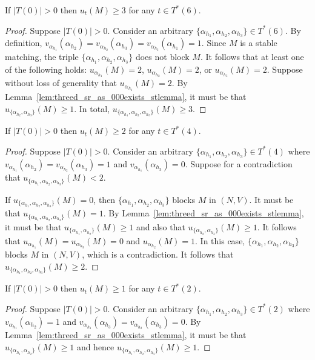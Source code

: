 \begin{lem}
\label{lem:threed_sr_as_some000exists_r1_lem}
If $|T(0)| > 0$ then $u_t(M)\geq 3$ for any $t \in T^*(6)$.
\end{lem}
\begin{proof}
Suppose $|T(0)| > 0$. Consider an arbitrary $\{ \alpha_{h_1}, \alpha_{h_2}, \alpha_{h_3} \} \in T^*(6)$. By definition, $v_{\alpha_{h_1}}(\alpha_{h_2})=v_{\alpha_{h_2}}(\alpha_{h_3})=v_{\alpha_{h_3}}(\alpha_{h_1})=1$. Since $M$ is a stable matching, the triple $\{ \alpha_{h_1}, \alpha_{h_2}, \alpha_{h_3} \}$ does not block $M$. It follows that at least one of the following holds: $u_{\alpha_{h_1}}(M)=2$, $u_{\alpha_{h_2}}(M)=2$, or $u_{\alpha_{h_3}}(M)=2$. Suppose without loss of generality that $u_{\alpha_{h_1}}(M)=2$. By Lemma~\ref{lem:threed_sr_as_000exists_stlemma}, it must be that $u_{\{ \alpha_{h_2}, \alpha_{h_3}\}}(M)\geq 1$. In total, $u_{\{ \alpha_{h_1}, \alpha_{h_2},\allowbreak \alpha_{h_3} \}}(M) \geq 3$.
\end{proof}

\begin{lem}
\label{lem:threed_sr_as_some000exists_r2_lem}
If $|T(0)| > 0$ then $u_t(M)\geq 2$ for any $t \in T^*(4)$.
\end{lem}
\begin{proof}
Suppose $|T(0)| > 0$. Consider an arbitrary $\{ \alpha_{h_1}, \alpha_{h_2}, \alpha_{h_3} \} \in T^*(4)$ where $v_{\alpha_{h_1}}(\alpha_{h_2}) = v_{\alpha_{h_2}}(\alpha_{h_3}) = 1$ and $v_{\alpha_{h_1}}(\alpha_{h_3})=0$. Suppose for a contradiction that $u_{\{ \alpha_{h_1}, \alpha_{h_2}, \alpha_{h_3} \}}(M) < 2$.

If $u_{\{ \alpha_{h_1}, \alpha_{h_2}, \alpha_{h_3} \}}(M) = 0$, then $\{ \alpha_{h_1}, \alpha_{h_2}, \alpha_{h_3} \}$ blocks $M$ in $(N,V)$. It must be that $u_{\{ \alpha_{h_1}, \alpha_{h_2}, \alpha_{h_3} \}}(M)=1$. By Lemma~\ref{lem:threed_sr_as_000exists_stlemma}, it must be that $u_{\{ \alpha_{h_1}, \alpha_{h_2}\}}(M)\geq 1$ and also that $u_{\{ \alpha_{h_2}, \alpha_{h_3}\}}(M)\geq 1$. It follows that $u_{\alpha_{h_1}}(M) = u_{\alpha_{h_3}}(M) = 0$ and $u_{\alpha_{h_2}}(M) = 1$. In this case, $\{ \alpha_{h_1}, \alpha_{h_2}, \alpha_{h_3} \}$ blocks $M$ in $(N, V)$, which is a contradiction. It follows that $u_{\{ \alpha_{h_1}, \alpha_{h_2}, \alpha_{h_3} \}}(M) \geq 2$.
\end{proof}

\begin{lem}
\label{lem:threed_sr_as_some000exists_r3_lem}
If $|T(0)| > 0$ then $u_t(M)\geq 1$ for any $t \in T^*(2)$.
\end{lem}
\begin{proof}
Suppose $|T(0)| > 0$. Consider an arbitrary $\{ \alpha_{h_1}, \alpha_{h_2}, \alpha_{h_3} \} \in T^*(2)$ where $v_{\alpha_{h_1}}(\alpha_{h_2})=1$ and $v_{\alpha_{h_1}}(\alpha_{h_3})=v_{\alpha_{h_2}}(\alpha_{h_3})=0$. By Lemma~\ref{lem:threed_sr_as_000exists_stlemma}, it must be that $u_{\{ \alpha_{h_1}, \alpha_{h_2}\}}(M)\geq 1$ and hence $u_{\{ \alpha_{h_1}, \alpha_{h_2}, \alpha_{h_3} \}}(M)\geq 1$.
\end{proof}

